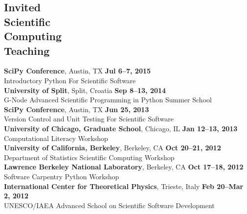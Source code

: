 \documentclass[margin,line]{resume}
\begin{document}
\begin{resume}
    \section{\mysidestyle Invited\\Scientific\\Computing\\Teaching}
    \textbf{SciPy Conference}, Austin, TX \hfill \textbf{Jul 6--7, 2015}\\
    Introductory Python For Scientific Software
               \vspace{2mm}\\
    \textbf{University of Split}, Split, Croatia \hfill \textbf{Sep 8--13, 2014}\\
    G-Node Advanced Scientific Programming in Python Summer School
               \vspace{2mm}\\
    \textbf{SciPy Conference}, Austin, TX \hfill \textbf{Jun 25, 2013}\\
    Version Control and Unit Testing For Scientific Software
               \vspace{2mm}\\
    \textbf{University of Chicago, Graduate School}, Chicago, IL \hfill \textbf{Jan 12--13, 2013}\\
    Computational Literacy Workshop
               \vspace{2mm}\\
    \textbf{University of California, Berkeley}, Berkeley, CA \hfill \textbf{Oct 20--21, 2012}\\
    Department of Statistics Scientific Computing Workshop
               \vspace{2mm}\\
    \textbf{Lawrence Berkeley National Laboratory}, Berkeley, CA \hfill \textbf{Oct 17--18, 2012}\\
    Software Carpentry Python Workshop
               \vspace{2mm}\\
    \textbf{International Center for Theoretical Physics}, Trieste, Italy \hfill \textbf{Feb 20--Mar 2, 2012}\\
    UNESCO/IAEA Advanced School on Scientific Software Development

\end{resume}
\end{document}
